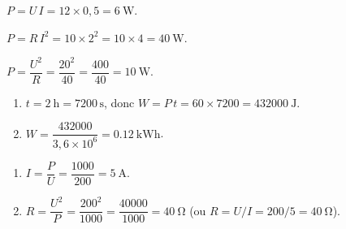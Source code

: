 \documentclass[11pt,a4paper]{article}
\begin{document}
\usetikzlibrary{babel}
\begin{corrige}[puissance $P=UI$]
$P=U\,I=12\times0{,}5=\qty{6}{\watt}$.
\end{corrige}

\begin{corrige}[puissance par effet Joule $P=RI^2$]
$P=R\,I^{2}=10\times2^{2}=10\times4=\qty{40}{\watt}$.
\end{corrige}

\begin{corrige}[puissance $P=U^2/R$]
$P=\dfrac{U^{2}}{R}=\dfrac{20^{2}}{40}=\dfrac{400}{40}=\qty{10}{\watt}$.
\end{corrige}

\begin{corrige}
\begin{enumerate}[label=\alph*)]
  \item $t=\qty{2}{\hour}=7200\,\si{\second}$, donc $W=P\,t=60\times7200=\qty{432000}{\joule}$.
  \item $W=\dfrac{432000}{3{,}6\times10^{6}}=\qty{0.12}{\kilo\watt\hour}$.
\end{enumerate}
\end{corrige}

\begin{corrige}
\begin{enumerate}[label=\alph*)]
  \item $I=\dfrac{P}{U}=\dfrac{1000}{200}=\qty{5}{\ampere}$.
  \item $R=\dfrac{U^{2}}{P}=\dfrac{200^{2}}{1000}=\dfrac{40000}{1000}=\qty{40}{\ohm}$
        (ou $R=U/I=200/5=\qty{40}{\ohm}$).
\end{enumerate}
\end{corrige}
\end{document}
